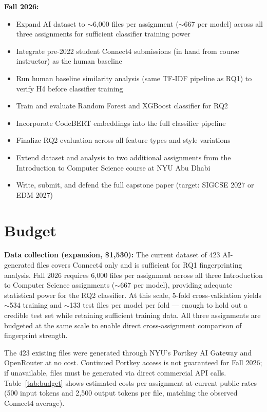\documentclass[sigconf]{acmart}
\begin{document}
\textbf{Fall 2026:}
\begin{itemize}
  \item Expand AI dataset to $\sim$6,000 files per assignment ($\sim$667 per model) across all three assignments for sufficient classifier training power
  \item Integrate pre-2022 student Connect4 submissions (in hand from course instructor) as the human baseline
  \item Run human baseline similarity analysis (same TF-IDF pipeline as RQ1) to verify H4 before classifier training
  \item Train and evaluate Random Forest and XGBoost classifier for RQ2
  \item Incorporate CodeBERT embeddings into the full classifier pipeline
  \item Finalize RQ2 evaluation across all feature types and style variations
  \item Extend dataset and analysis to two additional assignments from the Introduction to Computer Science course at NYU Abu Dhabi
  \item Write, submit, and defend the full capstone paper (target: SIGCSE 2027 or EDM 2027)
\end{itemize}

\section{Budget}

\textbf{Data collection (expansion, \$1,530):} The current dataset of 423 AI-generated files covers Connect4 only and is sufficient for RQ1 fingerprinting analysis. Fall 2026 requires 6,000 files per assignment across all three Introduction to Computer Science assignments ($\sim$667 per model), providing adequate statistical power for the RQ2 classifier. At this scale, 5-fold cross-validation yields $\sim$534 training and $\sim$133 test files per model per fold --- enough to hold out a credible test set while retaining sufficient training data. All three assignments are budgeted at the same scale to enable direct cross-assignment comparison of fingerprint strength.

The 423 existing files were generated through NYU's Portkey AI Gateway and OpenRouter at no cost. Continued Portkey access is not guaranteed for Fall 2026; if unavailable, files must be generated via direct commercial API calls. Table~\ref{tab:budget} shows estimated costs per assignment at current public rates (500 input tokens and 2,500 output tokens per file, matching the observed Connect4 average).
\end{document}
